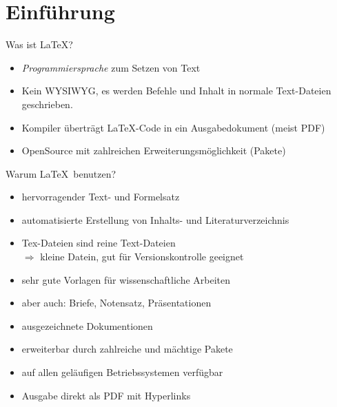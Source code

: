 \section{Einführung}

\begin{frame}{Was ist \LaTeX?}
    \begin{itemize}
        \item \emph{Programmiersprache} zum Setzen von Text
        \item Kein WYSIWYG, es werden Befehle und Inhalt in normale Text-Dateien geschrieben.
        \item Kompiler überträgt \LaTeX-Code in ein Ausgabedokument (meist PDF)
        \item OpenSource mit zahlreichen Erweiterungsmöglichkeit (Pakete)
    \end{itemize}
\end{frame}

\begin{frame}{Warum \LaTeX \ benutzen?}
    \begin{itemize}
        \item hervorragender Text- und Formelsatz
        \item automatisierte Erstellung von Inhalts- und Literaturverzeichnis
        \item Tex-Dateien sind reine Text-Dateien \\
              $\Rightarrow$ kleine Datein, gut für Versionskontrolle geeignet
        \item sehr gute Vorlagen für wissenschaftliche Arbeiten 
        \item aber auch: Briefe, Notensatz, Präsentationen 
        \item ausgezeichnete Dokumentionen
        \item erweiterbar durch zahlreiche und mächtige Pakete
        \item auf allen geläufigen Betriebssystemen verfügbar
        \item Ausgabe direkt als PDF mit Hyperlinks
    \end{itemize}
\end{frame}

\begin{frame}
  \centering
\end{frame}

\begin{frame}[t]
  \centering
\end{frame}
